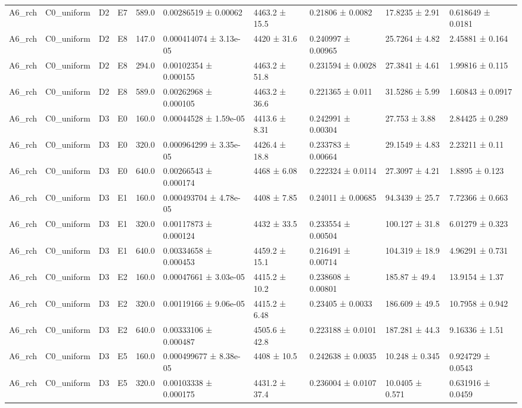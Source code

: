 \begin{table}
\begin{tabular}{llllllllll}
A6\_rch & C0\_uniform & D2 & E7 & 589.0 & 0.00286519 ± 0.00062 & 4463.2 ± 15.5 & 0.21806 ± 0.0082 & 17.8235 ± 2.91 & 0.618649 ± 0.0181 \\
A6\_rch & C0\_uniform & D2 & E8 & 147.0 & 0.000414074 ± 3.13e-05 & 4420 ± 31.6 & 0.240997 ± 0.00965 & 25.7264 ± 4.82 & 2.45881 ± 0.164 \\
A6\_rch & C0\_uniform & D2 & E8 & 294.0 & 0.00102354 ± 0.000155 & 4463.2 ± 51.8 & 0.231594 ± 0.0028 & 27.3841 ± 4.61 & 1.99816 ± 0.115 \\
A6\_rch & C0\_uniform & D2 & E8 & 589.0 & 0.00262968 ± 0.000105 & 4463.2 ± 36.6 & 0.221365 ± 0.011 & 31.5286 ± 5.99 & 1.60843 ± 0.0917 \\
A6\_rch & C0\_uniform & D3 & E0 & 160.0 & 0.00044528 ± 1.59e-05 & 4413.6 ± 8.31 & 0.242991 ± 0.00304 & 27.753 ± 3.88 & 2.84425 ± 0.289 \\
A6\_rch & C0\_uniform & D3 & E0 & 320.0 & 0.000964299 ± 3.35e-05 & 4426.4 ± 18.8 & 0.233783 ± 0.00664 & 29.1549 ± 4.83 & 2.23211 ± 0.11 \\
A6\_rch & C0\_uniform & D3 & E0 & 640.0 & 0.00266543 ± 0.000174 & 4468 ± 6.08 & 0.222324 ± 0.0114 & 27.3097 ± 4.21 & 1.8895 ± 0.123 \\
A6\_rch & C0\_uniform & D3 & E1 & 160.0 & 0.000493704 ± 4.78e-05 & 4408 ± 7.85 & 0.24011 ± 0.00685 & 94.3439 ± 25.7 & 7.72366 ± 0.663 \\
A6\_rch & C0\_uniform & D3 & E1 & 320.0 & 0.00117873 ± 0.000124 & 4432 ± 33.5 & 0.233554 ± 0.00504 & 100.127 ± 31.8 & 6.01279 ± 0.323 \\
A6\_rch & C0\_uniform & D3 & E1 & 640.0 & 0.00334658 ± 0.000453 & 4459.2 ± 15.1 & 0.216491 ± 0.00714 & 104.319 ± 18.9 & 4.96291 ± 0.731 \\
A6\_rch & C0\_uniform & D3 & E2 & 160.0 & 0.00047661 ± 3.03e-05 & 4415.2 ± 10.2 & 0.238608 ± 0.00801 & 185.87 ± 49.4 & 13.9154 ± 1.37 \\
A6\_rch & C0\_uniform & D3 & E2 & 320.0 & 0.00119166 ± 9.06e-05 & 4415.2 ± 6.48 & 0.23405 ± 0.0033 & 186.609 ± 49.5 & 10.7958 ± 0.942 \\
A6\_rch & C0\_uniform & D3 & E2 & 640.0 & 0.00333106 ± 0.000487 & 4505.6 ± 42.8 & 0.223188 ± 0.0101 & 187.281 ± 44.3 & 9.16336 ± 1.51 \\
A6\_rch & C0\_uniform & D3 & E5 & 160.0 & 0.000499677 ± 8.38e-05 & 4408 ± 10.5 & 0.242638 ± 0.0035 & 10.248 ± 0.345 & 0.924729 ± 0.0543 \\
A6\_rch & C0\_uniform & D3 & E5 & 320.0 & 0.00103338 ± 0.000175 & 4431.2 ± 37.4 & 0.236004 ± 0.0107 & 10.0405 ± 0.571 & 0.631916 ± 0.0459 \\

\end{tabular}
\end{table}
